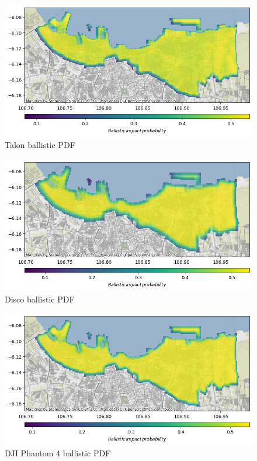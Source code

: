 \documentclass[12pt]{report}
\begin{document}
        \begin{figure}[H]
            \centering
            \includegraphics[width=\textwidth]{Plot/talon/ballistic_fpdf.png}
            \caption{Talon ballistic PDF}
        \end{figure}
        \begin{figure}[H]
            \centering
            \includegraphics[width=\textwidth]{Plot/parrot/ballistic_pdf.png}
            \caption{Disco ballistic PDF}
        \end{figure}
        \begin{figure}[H]
            \centering
            \includegraphics[width=\textwidth]{Plot/phantom4/ballistic_pdf.png}
            \caption{DJI Phantom 4 ballistic PDF}
        \end{figure}
\end{document}
